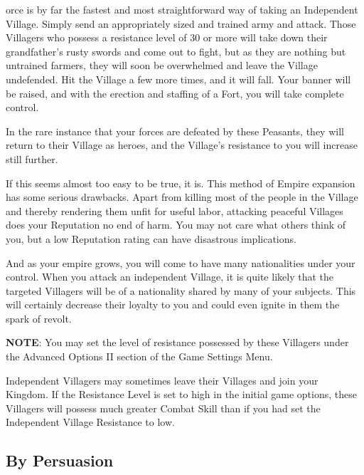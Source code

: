 
orce is by far the fastest and most straightforward way of taking an Independent Village. Simply send an appropriately sized and trained army and attack. Those Villagers who possess a resistance level of 30 or more will take down their grandfather’s rusty swords and come out to fight, but as they are nothing but untrained farmers, they will soon be overwhelmed and leave the Village undefended. Hit the Village a few more times, and it will fall. Your banner will be raised, and with the erection and staffing of a Fort, you will take complete control.

In the rare instance that your forces are defeated by these Peasants, they will return to their Village as heroes, and the Village’s resistance to you will increase still further.


If this seems almost too easy to be true, it is. This method of Empire expansion has some serious drawbacks. Apart from killing most of the people in the Village and thereby rendering them unfit for useful labor, attacking peaceful Villages does your Reputation no end of harm. You may not care what others think of you, but a low Reputation rating can have disastrous implications.

And as your empire grows, you will come to have many nationalities under your control. When you attack an independent Village, it is quite likely that the targeted Villagers will be of a nationality shared by many of your subjects. This will certainly decrease their loyalty to you and could even ignite in them the spark of revolt.

\textbf{NOTE}: You may set the level of resistance possessed by these Villagers under the Advanced Options II section of the Game Settings Menu.

Independent Villagers may sometimes leave their Villages and join your Kingdom. If the Resistance Level is set to high in the initial game options, these Villagers will possess much greater Combat Skill than if you had set the Independent Village Resistance to low.

\subsection{\textsf{By Persuasion}}


